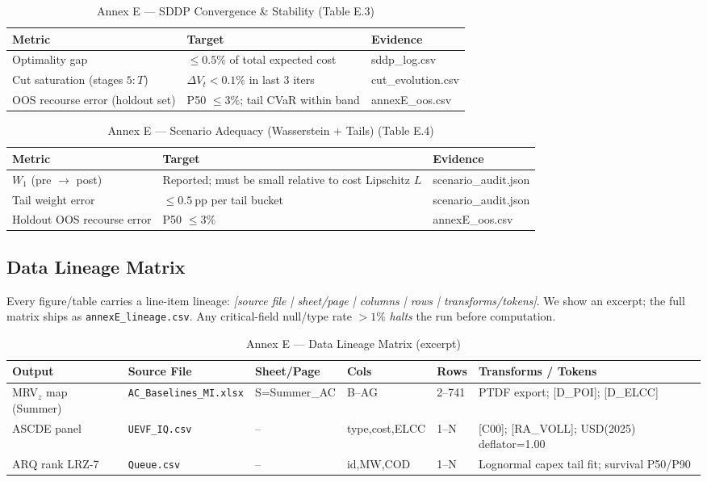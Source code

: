\documentclass[11pt]{article}
\numberwithin{equation}{section}
\theoremstyle{definition}
\theoremstyle{remark}
\begin{document}
\begin{table}[h]
\centering
\caption{Annex E — SDDP Convergence \& Stability (Table E.3)}
\label{tab:E3}
\begin{tabular}{@{}lll@{}}
\toprule
\textbf{Metric} & \textbf{Target} & \textbf{Evidence} \\
\midrule
Optimality gap & $\le 0.5\%$ of total expected cost & sddp\_log.csv \\
Cut saturation (stages $5\!:\!T$) & $\Delta V_t<0.1\%$ in last 3 iters & cut\_evolution.csv \\
OOS recourse error (holdout set) & P50 $\le 3\%$; tail CVaR within band & annexE\_oos.csv \\
\bottomrule
\end{tabular}
\end{table}

\begin{table}[h]
\centering
\caption{Annex E — Scenario Adequacy (Wasserstein + Tails) (Table E.4)}
\label{tab:E4}
\begin{tabular}{@{}lll@{}}
\toprule
\textbf{Metric} & \textbf{Target} & \textbf{Evidence} \\
\midrule
$W_1$ (pre $\rightarrow$ post) & Reported; must be small relative to cost Lipschitz $L$ & scenario\_audit.json \\
Tail weight error & $\le 0.5\ \mathrm{pp}$ per tail bucket & scenario\_audit.json \\
Holdout OOS recourse error & P50 $\le 3\%$ & annexE\_oos.csv \\
\bottomrule
\end{tabular}
\end{table}

\subsection{Data Lineage Matrix}
\label{E2}
Every figure/table carries a line-item lineage: \emph{[source file | sheet/page | columns | rows | transforms/tokens]}. We show an excerpt; the full matrix ships as \texttt{annexE\_lineage.csv}. Any critical-field null/type rate $>\!1\%$ \emph{halts} the run before computation.

\begin{table}[h]
\centering
\caption{Annex E — Data Lineage Matrix (excerpt)}
\label{tab:lineage}
\begin{tabular}{@{2cm}lllllp{4.5cm}@{}}
\toprule
\textbf{Output} & \textbf{Source File} & \textbf{Sheet/Page} & \textbf{Cols} & \textbf{Rows} & \textbf{Transforms / Tokens} \\
\midrule
MRV$_{z}$ map (Summer) & \texttt{AC\_Baselines\_MI.xlsx} & S=Summer\_AC & B--AG & 2--741 & PTDF export; [D\_POI]; [D\_ELCC] \\
ASCDE panel & \texttt{UEVF\_IQ.csv} & -- & type,cost,ELCC & 1--N & [C00]; [RA\_VOLL]; USD(2025) deflator=1.00 \\
ARQ rank LRZ-7 & \texttt{Queue.csv} & -- & id,MW,COD & 1--N & Lognormal capex tail fit; survival P50/P90 \\
\bottomrule
\end{tabular}
\end{table}
\end{document}
